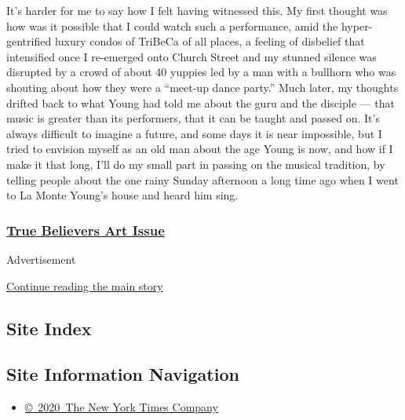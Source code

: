 It's harder for me to say how I felt having witnessed this. My first
thought was how was it possible that I could watch such a performance,
amid the hyper-gentrified luxury condos of TriBeCa of all places, a
feeling of disbelief that intensified once I re-emerged onto Church
Street and my stunned silence was disrupted by a crowd of about 40
yuppies led by a man with a bullhorn who was shouting about how they
were a ``meet-up dance party.'' Much later, my thoughts drifted back to
what Young had told me about the guru and the disciple --- that music is
greater than its performers, that it can be taught and passed on. It's
always difficult to imagine a future, and some days it is near
impossible, but I tried to envision myself as an old man about the age
Young is now, and how if I make it that long, I'll do my small part in
passing on the musical tradition, by telling people about the one rainy
Sunday afternoon a long time ago when I went to La Monte Young's house
and heard him sing.

\hypertarget{true-believers-art-issue}{%
\subsubsection{\texorpdfstring{\href{https://www.nytimes3xbfgragh.onion/issue/t-magazine/2020/07/02/true-believers-art-issue}{True
Believers Art
Issue}}{True Believers Art Issue}}\label{true-believers-art-issue}}

Advertisement

\protect\hyperlink{after-bottom}{Continue reading the main story}

\hypertarget{site-index}{%
\subsection{Site Index}\label{site-index}}

\hypertarget{site-information-navigation}{%
\subsection{Site Information
Navigation}\label{site-information-navigation}}

\begin{itemize}
\tightlist
\item
  \href{https://help.nytimes3xbfgragh.onion/hc/en-us/articles/115014792127-Copyright-notice}{©~2020~The
  New York Times Company}
\end{itemize}

